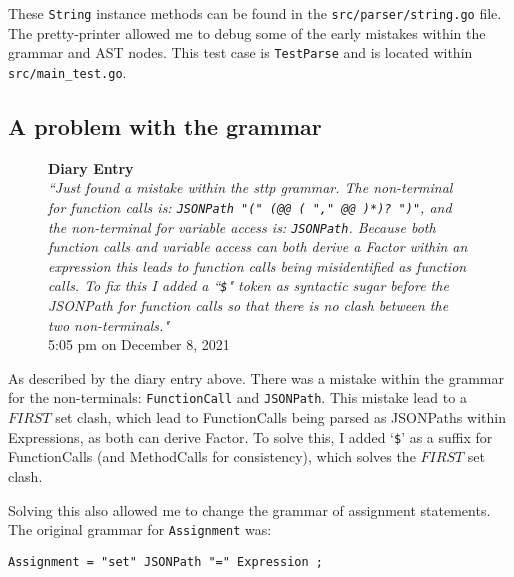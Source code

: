 These \verb|String| instance methods can be found in the \verb|src/parser/string.go| file. The pretty-printer allowed me to debug some of the early mistakes within the grammar and AST nodes. This test case is \verb|TestParse| and is located within \verb|src/main_test.go|.

\subsection{A problem with the grammar}

\begin{figure}[H]
    \begin{center}
        \textbf{Diary Entry}\\[0.5em]
        \cprotect\textit{``Just found a mistake within the sttp grammar. The non-terminal for function calls is: \verb|JSONPath "(" (@@ ( "," @@ )*)? ")"|, and the non-terminal for variable access is: \verb|JSONPath|. Because both function calls and variable access can both derive a Factor within an expression this leads to function calls being misidentified as function calls. To fix this I added a ``\verb|$|" token as syntactic sugar before the JSONPath for function calls so that there is no clash between the two non-terminals."}\\[0.5em]
        \tiny{5:05 pm on December 8, 2021}
    \end{center}
\end{figure}

As described by the diary entry above. There was a mistake within the grammar for the non-terminals: \verb|FunctionCall| and \verb|JSONPath|. This mistake lead to a $FIRST$ set clash, which lead to FunctionCalls being parsed as JSONPaths within Expressions, as both can derive Factor. To solve this, I added `\verb|$|' as a suffix for FunctionCalls (and MethodCalls for consistency), which solves the $FIRST$ set clash.

Solving this also allowed me to change the grammar of assignment statements. The original grammar for \verb|Assignment| was:

\begin{verbatim}
Assignment = "set" JSONPath "=" Expression ;
\end{verbatim}

